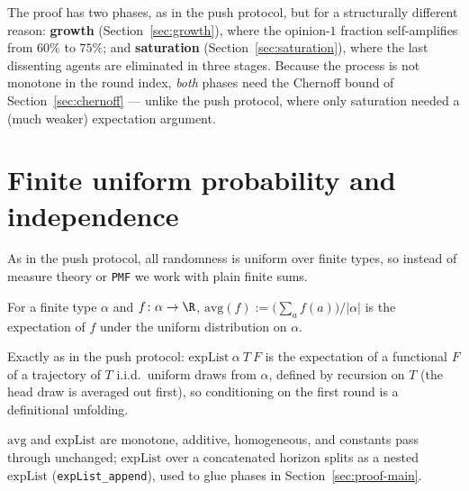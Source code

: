 The proof has two phases, as in the push protocol, but for a structurally
different reason: \textbf{growth} (Section~\ref{sec:growth}), where the
opinion-$1$ fraction self-amplifies from $60\%$ to $75\%$; and
\textbf{saturation} (Section~\ref{sec:saturation}), where the last
dissenting agents are eliminated in three stages. Because the process is
not monotone in the round index, \emph{both} phases need the Chernoff bound
of Section~\ref{sec:chernoff} --- unlike the push protocol, where only
saturation needed a (much weaker) expectation argument.

\section{Finite uniform probability and independence}\label{sec:prelim}

As in the push protocol, all randomness is uniform over finite types, so
instead of measure theory or \texttt{PMF} we work with plain finite sums.

\begin{definition}[Average]\label{def:avg}
  \leanok
  For a finite type $\alpha$ and $f \colon \alpha \to \R$,
  $\mathrm{avg}(f) := \bigl(\sum_a f(a)\bigr)/|\alpha|$ is the expectation of
  $f$ under the uniform distribution on $\alpha$.
\end{definition}

\begin{definition}\label{def:expList}
  \leanok
  Exactly as in the push protocol: $\mathrm{expList}\ \alpha\ T\ F$ is the
  expectation of a functional $F$ of a trajectory of $T$ i.i.d.\ uniform
  draws from $\alpha$, defined by recursion on $T$ (the head draw is
  averaged out first), so conditioning on the first round is a definitional
  unfolding.
\end{definition}

\begin{lemma}\label{lem:avg-basic}
  \leanok
  $\mathrm{avg}$ and $\mathrm{expList}$ are monotone, additive, homogeneous,
  and constants pass through unchanged; $\mathrm{expList}$ over a
  concatenated horizon splits as a nested $\mathrm{expList}$
  (\texttt{expList\_append}), used to glue phases in
  Section~\ref{sec:proof-main}.
\end{lemma}


